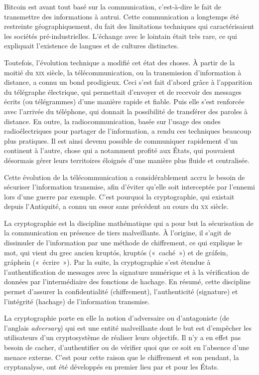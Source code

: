 \documentclass[
  a5paper,
  smalldemyvopaper,10pt,twoside,onecolumn,openright,extrafontsizes,hidelinks]{memoir}
\begin{document}

Bitcoin est avant tout basé sur la communication, c'est-à-dire le fait
de transmettre des informations à autrui. Cette communication a
longtemps été restreinte géographiquement, du fait des limitations
techniques qui caractérisaient les sociétés pré-industrielles. L'échange
avec le lointain était très rare, ce qui expliquait l'existence de
langues et de cultures distinctes.

Toutefois, l'évolution technique a modifié cet état des choses. À partir
de la moitié du \textsc{xix} siècle, la télécommunication, ou la
transmission d'information à distance, a connu un bond prodigieux. Ceci
s'est fait d'abord grâce à l'apparition du télégraphe électrique, qui
permettait d'envoyer et de recevoir des messages écrits (ou télégrammes)
d'une manière rapide et fiable. Puis elle s'est renforcée avec l'arrivée
du téléphone, qui donnait la possibilité de transférer des paroles à
distance. En outre, la radiocommunication, basée sur l'usage des ondes
radioélectriques pour partager de l'information, a rendu ces techniques
beaucoup plus pratiques. Il est ainsi devenu possible de communiquer
rapidement d'un continent à l'autre, chose qui a notamment profité aux
États, qui pouvaient désormais gérer leurs territoires éloignés d'une
manière plus fluide et centralisée.

Cette évolution de la télécommunication a considérablement accru le
besoin de sécuriser l'information transmise, afin d'éviter qu'elle soit
interceptée par l'ennemi lors d'une guerre par exemple. C'est pourquoi
la cryptographie, qui existait depuis l'Antiquité, a connu un essor sans
précédent au cours du \textsc{xx} siècle.

La cryptographie est la discipline mathématique qui a pour but la
sécurisation de la communication en présence de tiers malveillants. À
l'origine, il s'agit de dissimuler de l'information par une méthode de
chiffrement, ce qui explique le mot, qui vient du grec ancien
\foreignlanguage{greek}{kruptós}, kruptós («~caché~») et de
\foreignlanguage{greek}{gráfein}, gráphein («~écrire~»). Par la suite,
la cryptographie s'est étendue à l'authentification de messages avec la
signature numérique et à la vérification de données par l'intermédiaire
des fonctions de hachage. En résumé, cette discipline permet d'assurer
la confidentialité (chiffrement), l'authenticité (signature) et
l'intégrité (hachage) de l'information transmise.

La cryptographie porte en elle la notion d'adversaire ou d'antagoniste
(de l'anglais \emph{adversary}) qui est une entité malveillante dont le
but est d'empêcher les utilisateurs d'un cryptosystème de réaliser leurs
objectifs. Il n'y a en effet pas besoin de cacher, d'authentifier ou de
vérifier quoi que ce soit en l'absence d'une menace externe. C'est pour
cette raison que le chiffrement et son pendant, la cryptanalyse, ont été
développés en premier lieu par et pour les États.
\end{document}
